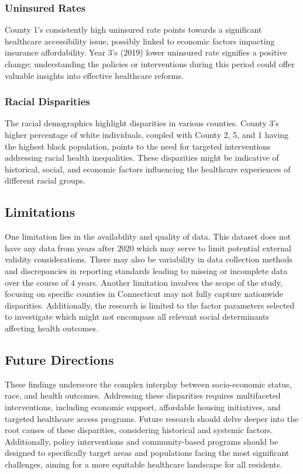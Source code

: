 \documentclass[12pt]{article}
\begin{document}
\subsubsection{Uninsured Rates}
County 1's consistently high uninsured rate points towards a significant healthcare accessibility issue, 
possibly linked to economic factors impacting insurance affordability. Year 3's (2019) lower uninsured rate signifies 
a positive change; understanding the policies or interventions during this period could offer valuable insights into 
effective healthcare reforms.

\subsubsection{Racial Disparities}
The racial demographics highlight disparities in various counties. County 3's higher percentage of white 
individuals, coupled with County 2, 5, and 1 having the highest black population, points to the need for
targeted interventions addressing racial health inequalities. These disparities might be indicative of 
historical, social, and economic factors influencing the healthcare experiences of different racial groups.

\subsection{Limitations}
One limitation lies in the availability and quality of data. This dataset does not have any 
data from years after 2020 which may serve to limit potential external validity considerations. 
There may also be variability in data collection methods and discrepancies in reporting standards 
leading to missing or incomplete data over the course of 4 years. Another limitation involves the scope 
of the study, focusing on specific counties in Connecticut may not fully capture nationwide disparities. 
Additionally, the research is limited to the factor parameters selected to investigate which  might not 
encompass all relevant social determinants affecting health outcomes.

\subsection{Future Directions}
These findings underscore the complex interplay between socio-economic status, race, and health outcomes. 
Addressing these disparities requires multifaceted interventions, including economic support, affordable 
housing initiatives, and targeted healthcare access programs. Future research should delve deeper into the 
root causes of these disparities, considering historical and systemic factors. Additionally, policy interventions 
and community-based programs should be designed to specifically target areas and populations facing the most 
significant challenges, aiming for a more equitable healthcare landscape for all residents.


\appendix



\end{document}
